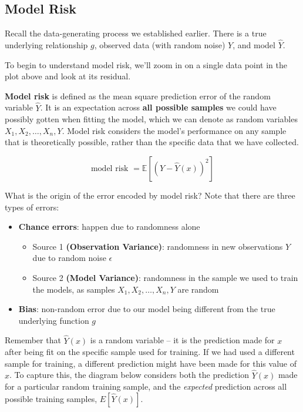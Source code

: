 \documentclass[
  letterpaper,
  DIV=11,
  numbers=noendperiod]{scrreprt}
\providecommand{\tightlist}{%
  \setlength{\itemsep}{0pt}\setlength{\parskip}{0pt}}\usepackage{longtable,booktabs,array}
\begin{document}
\subsection{Model Risk}\label{model-risk}

Recall the data-generating process we established earlier. There is a
true underlying relationship \(g\), observed data (with random noise)
\(Y\), and model \(\hat{Y}\).

To begin to understand model risk, we'll zoom in on a single data point
in the plot above and look at its residual.

\textbf{Model risk} is defined as the mean square prediction error of
the random variable \(\hat{Y}\). It is an expectation across \textbf{all
possible samples} we could have possibly gotten when fitting the model,
which we can denote as random variables \(X_1, X_2, \ldots, X_n, Y\).
Model risk considers the model's performance on any sample that is
theoretically possible, rather than the specific data that we have
collected.

\[\text{model risk }=\mathbb{E}\left[(Y-\hat{Y}(x))^2\right]\]

What is the origin of the error encoded by model risk? Note that there
are three types of errors:

\begin{itemize}
\tightlist
\item
  \textbf{Chance errors}: happen due to randomness alone

  \begin{itemize}
  \tightlist
  \item
    Source 1 \textbf{(Observation Variance)}: randomness in new
    observations \(Y\) due to random noise \(\epsilon\)
  \item
    Source 2 \textbf{(Model Variance)}: randomness in the sample we used
    to train the models, as samples \(X_1, X_2, \ldots, X_n, Y\) are
    random
  \end{itemize}
\item
  \textbf{Bias}: non-random error due to our model being different from
  the true underlying function \(g\)
\end{itemize}

Remember that \(\hat{Y}(x)\) is a random variable -- it is the
prediction made for \(x\) after being fit on the specific sample used
for training. If we had used a different sample for training, a
different prediction might have been made for this value of \(x\). To
capture this, the diagram below considers both the prediction
\(\hat{Y}(x)\) made for a particular random training sample, and the
\emph{expected} prediction across all possible training samples,
\(E[\hat{Y}(x)]\).
\end{document}
